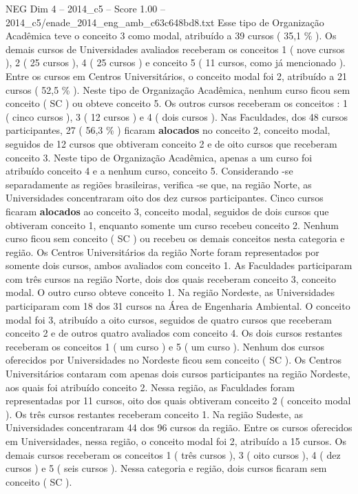 \begin{textsample}{NEG Dim 4 – 2014\_c5 – Score 1.00 – 2014\_c5/enade\_2014\_eng\_amb\_c63c648bd8.txt}
Esse tipo de Organização Acadêmica teve o conceito 3 como modal, atribuído a 39 cursos ( 35,1 \% ).
Os demais cursos de Universidades avaliados receberam os conceitos 1 ( nove cursos ), 2 ( 25 cursos ), 4 ( 25 cursos ) e conceito 5 ( 11 cursos, como já mencionado ).
Entre os cursos em Centros Universitários, o conceito modal foi 2, atribuído a 21 cursos ( 52,5 \% ).
Neste tipo de Organização Acadêmica, nenhum curso ficou sem conceito ( SC ) ou obteve conceito 5.
Os outros cursos receberam os conceitos : 1 ( cinco cursos ), 3 ( 12 cursos ) e 4 ( dois cursos ).
Nas Faculdades, dos 48 cursos participantes, 27 ( 56,3 \% ) ficaram \textbf{alocados} no conceito 2, conceito modal, seguidos de 12 cursos que obtiveram conceito 2 e de oito cursos que receberam conceito 3.
Neste tipo de Organização Acadêmica, apenas a um curso foi atribuído conceito 4 e a nenhum curso, conceito 5.
Considerando -se separadamente as regiões brasileiras, verifica -se que, na região Norte, as Universidades concentraram oito dos dez cursos participantes.
Cinco cursos ficaram \textbf{alocados} ao conceito 3, conceito modal, seguidos de dois cursos que obtiveram conceito 1, enquanto somente um curso recebeu conceito 2.
Nenhum curso ficou sem conceito ( SC ) ou recebeu os demais conceitos nesta categoria e região.
Os Centros Universitários da região Norte foram representados por somente dois cursos, ambos avaliados com conceito 1.
As Faculdades participaram com três cursos na região Norte, dois dos quais receberam conceito 3, conceito modal.
O outro curso obteve conceito 1.
Na região Nordeste, as Universidades participaram com 18 dos 31 cursos na Área de Engenharia Ambiental.
O conceito modal foi 3, atribuído a oito cursos, seguidos de quatro cursos que receberam conceito 2 e de outros quatro avaliados com conceito 4.
Os dois cursos restantes receberam os conceitos 1 ( um curso ) e 5 ( um curso ).
Nenhum dos cursos oferecidos por Universidades no Nordeste ficou sem conceito ( SC ).
Os Centros Universitários contaram com apenas dois cursos participantes na região Nordeste, aos quais foi atribuído conceito 2.
Nessa região, as Faculdades foram representadas por 11 cursos, oito dos quais obtiveram conceito 2 ( conceito modal ).
Os três cursos restantes receberam conceito 1.
Na região Sudeste, as Universidades concentraram 44 dos 96 cursos da região.
Entre os cursos oferecidos em Universidades, nessa região, o conceito modal foi 2, atribuído a 15 cursos.
Os demais cursos receberam os conceitos 1 ( três cursos ), 3 ( oito cursos ), 4 ( dez cursos ) e 5 ( seis cursos ).
Nessa categoria e região, dois cursos ficaram sem conceito ( SC ).

\end{textsample}
